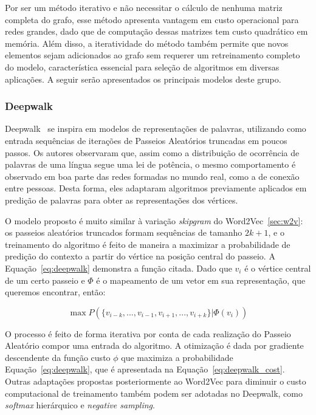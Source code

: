 Por ser um método iterativo e não necessitar o cálculo de nenhuma matriz completa
do grafo, esse método apresenta vantagem em custo operacional para redes
grandes, dado que de computação dessas matrizes tem custo quadrático em memória.
Além disso, a iteratividade do método também permite que novos elementos sejam
adicionados ao grafo sem requerer um retreinamento completo do modelo,
característica essencial para seleção de algoritmos em diversas aplicações.
A seguir serão apresentados os principais modelos deste grupo.

\subsubsection{Deepwalk}

Deepwalk~\cite{perozzi14} se inspira em modelos de representações de palavras,
utilizando como entrada sequências de iterações de Passeios Aleatórios truncadas
em poucos passos.
Os autores observaram que, assim como a distribuição de ocorrência de palavras de
uma língua segue uma lei de potência, o mesmo comportamento é observado em boa
parte das redes formadas no mundo real, como a de conexão entre pessoas.
Desta forma, eles adaptaram algoritmos previamente aplicados em predição de
palavras para obter as representações dos vértices.

O modelo proposto é muito similar à variação \textit{skipgram} do
Word2Vec~\ref{sec:w2v}: os passeios aleatórios truncados formam sequências de
tamanho $2k + 1$, e o treinamento do algoritmo é feito de maneira a maximizar a
probabilidade de predição do contexto a partir do vértice na posição central do
passeio.
A Equação~\ref{eq:deepwalk} demonstra a função citada.
Dado que $v_i$ é o vértice central de um certo passeio e $\Phi$ é o mapeamento
de um vetor em sua representação, que queremos encontrar, então:

\begin{equation} \label{eq:deepwalk}
    \operatorname{max} P(\{v_{i-k},...,v_{i-1},v_{i+1},...,v_{i+k}\}|\Phi(v_i))
\end{equation}

O processo é feito de forma iterativa por conta de cada realização do Passeio
Aleatório compor uma entrada do algoritmo.
A otimização é dada por gradiente descendente da função custo $\phi$ que maximiza
a probabilidade Equação~\ref{eq:deepwalk}, que é apresentada na
Equação~\ref{eq:deepwalk_cost}.
Outras adaptações propostas posteriormente ao Word2Vec para diminuir o custo
computacional de treinamento também podem ser adotadas no Deepwalk, como
\textit{softmax} hierárquico e \textit{negative sampling}.

